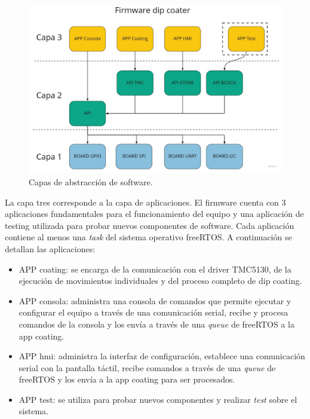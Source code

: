 \begin{figure}[h]
	\centering
	\includegraphics[width=1\textwidth]{./Figures/capas.jpg}
	\caption{Capas de abstracción de software.}
	\label{fig:capas}
\end{figure}


La capa tres corresponde a la capa de aplicaciones. El firmware cuenta con 3 aplicaciones fundamentales para el funcionamiento del equipo y una aplicación de testing utilizada para probar nuevos componentes de software. Cada aplicación contiene al menos una \textit{task} del sistema operativo freeRTOS. A continuación se detallan las aplicaciones:

\begin{itemize}

\item APP coating: se encarga de la comunicación con el driver TMC5130, de la ejecución de movimientos individuales y del proceso completo de dip coating.
\item APP consola: administra una consola de comandos que permite ejecutar y configurar el equipo a través de una comunicación serial, recibe y procesa comandos de la consola y los envía a través de una \textit{queue} de freeRTOS a la app coating.
\item APP hmi: administra la interfaz de configuración, establece una comunicación serial con la pantalla táctil, recibe comandos a través de una \textit{queue} de freeRTOS y los envía a la app coating para ser procesados.
\item APP test: se utiliza para probar nuevos componentes y realizar \textit{test} sobre el sistema.

\end{itemize}

